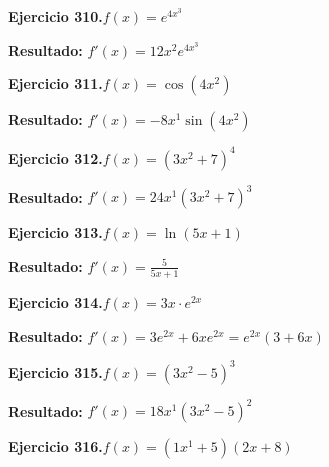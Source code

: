 \documentclass[10pt,a4paper]{article}
\begin{document}
\newpage
\begin{ejbox}
\textbf{Ejercicio 310.}\quad $f(x) = e^{4x^{3}}$
\end{ejbox}

\begin{solbox}
\textbf{Resultado:} \(\displaystyle f'(x) = 12x^{2}e^{4x^{3}}\)
\end{solbox}

\begin{ejbox}
\textbf{Ejercicio 311.}\quad $f(x) = \cos(4x^{2})$
\end{ejbox}

\begin{solbox}
\textbf{Resultado:} \(\displaystyle f'(x) = -8x^{1}\sin(4x^{2})\)
\end{solbox}

\begin{ejbox}
\textbf{Ejercicio 312.}\quad $f(x) = (3x^{2} +7)^{4}$
\end{ejbox}

\begin{solbox}
\textbf{Resultado:} \(\displaystyle f'(x) = 24x^{1}(3x^{2} +7)^{3}\)
\end{solbox}

\newpage
\begin{ejbox}
\textbf{Ejercicio 313.}\quad $f(x) = \ln(5x + 1)$
\end{ejbox}

\begin{solbox}
\textbf{Resultado:} \(\displaystyle f'(x) = \frac{5}{5x + 1}\)
\end{solbox}

\begin{ejbox}
\textbf{Ejercicio 314.}\quad $f(x) = 3x \cdot e^{2x}$
\end{ejbox}

\begin{solbox}
\textbf{Resultado:} \(\displaystyle f'(x) = 3e^{2x} + 6xe^{2x} = e^{2x}(3 + 6x)\)
\end{solbox}

\begin{ejbox}
\textbf{Ejercicio 315.}\quad $f(x) = (3x^{2} -5)^{3}$
\end{ejbox}

\begin{solbox}
\textbf{Resultado:} \(\displaystyle f'(x) = 18x^{1}(3x^{2} -5)^{2}\)
\end{solbox}

\newpage
\begin{ejbox}
\textbf{Ejercicio 316.}\quad $f(x) = (1x^{1} +5)(2x +8)$
\end{ejbox}
\end{document}
